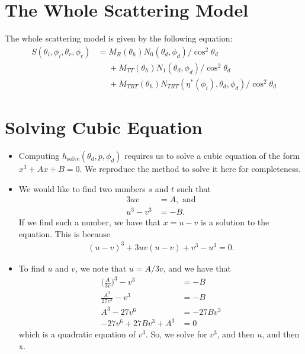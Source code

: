 \documentclass[10pt]{article}
\newcommand{\solve}{\mathrm{solve}}
\begin{document}
  \section{The Whole Scattering Model}
  
  The whole scattering model is given by the following equation:
  \begin{align*}
    S(\theta_i, \phi_i, \theta_r, \phi_r)
    &= M_R(\theta_h) N_0(\theta_d, \phi_d) / \cos^2 \theta_d\\
    &\phantom{{}={}}+ M_{TT}(\theta_h) N_1(\theta_d, \phi_d) / \cos^2 \theta_d\\
    &\phantom{{}={}} 
    + M_{TRT}(\theta_h) N_{TRT}(\eta^*(\phi_i), \theta_d, \phi_d) / \cos^2\theta_d  
  \end{align*}
  
  \section{Solving Cubic Equation}
  
  \begin{itemize}
    \item Computing $h_\solve(\theta_d, p, \phi_d)$ requires us to
      solve a cubic equation of the form $x^3 + Ax + B = 0$. 
      We reproduce the method to solve it here for completeness.
      
    \item We would like to find two numbers $s$ and $t$ such that
      \begin{align*}
        3uv &= A,\mbox{ and}\\
        u^3 - v^3 &= -B.
      \end{align*}
      If we find such a number, we have that
      $x = u - v$ is a solution to the equation. This is because
      \begin{align*}
        (u-v)^3 + 3uv(u-v) + v^3 - u^3 = 0.
      \end{align*}
      
    \item To find $u$ and $v$, we note that $u = A/3v$, and we have
      that
      \begin{align*}
        \bigg( \frac{A}{3v} \bigg)^3 - v^3 &= -B\\
        \frac{A^3}{27v^3} - v^3 &= -B\\
        A^3 - 27v^6 &= -27Bv^3\\
        -27 v^6 + 27 B v^3 + A^3 &= 0
      \end{align*}
      which is a quadratic equation of $v^3$. So, we solve for $v^3$,
      and then $u$, and then x.
      
  \end{itemize}
  

	
\end{document}
